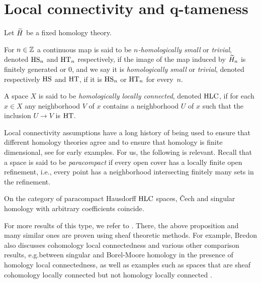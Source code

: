 
\section{Local connectivity and q-tameness}

Let $\widetilde{H}$ be a fixed homology theory.

\begin{defi} \label{defi:local_connectedness}
	For $n \in \mathbb{Z}$ a continuous map is said to be \textit{$n$-homologically small} or \textit{trivial}, denoted $\mathrm{HS}_n$ and $\mathrm{HT}_n$ respectively, if the image of the map induced by $\widetilde{H}_n$ is finitely generated or 0, and we say it is \textit{homologically small} or \textit{trivial}, denoted respectively $\mathrm{HS}$ and $\mathrm{HT}$, if it is $\mathrm{HS}_n$ or $\mathrm{HT}_n$ for every~$n$.
\end{defi}

\begin{defi}
	A space $X$ is said to be \emph{homologically locally connected}, denoted $\mathrm{HLC}$, if for each $x \in X$ any neighborhood $V$ of $x$ contains a neighborhood $U$ of $x$ such that the inclusion $U \to V$ is $\mathrm{HT}$.
\end{defi}

Local connectivity assumptions have a long history of being used to ensure that different homology theories agree and to ensure that homology is finite dimensional, see \cite{MR0007094} for early examples.
For us, the following is relevant.
Recall that a space is said to be \textit{paracompact} if every open cover has a locally finite open refinement, i.e., every point has a neighborhood intersecting finitely many sets in the refinement.

\begin{prop}[{\cite{MR105677, MR1481706}}] \label{prop:cech_sing_hom_hlc}
	On the category of paracompact Hausdorff $\mathrm{HLC}$ spaces, \v{C}ech and singular homology with arbitrary coefficients coincide.
\end{prop}

For more results of this type, we refer to \cite{MR1481706}. There, the above proposition \cite[Corollary VI.12.6]{MR1481706} and many similar ones are proven using sheaf theoretic methods.
For example, Bredon also discusses cohomology local connectedness \cite[Section II.17]{MR1481706} and various other comparison results, e.g.\@ between singular and Borel-Moore homology \cite[Corollary V.12.15]{MR1481706} in the presence of homology local connectedness, as well as examples such as spaces that are sheaf cohomology locally connected but not homology locally connected \cite[Example II.17.12]{MR1481706}.

